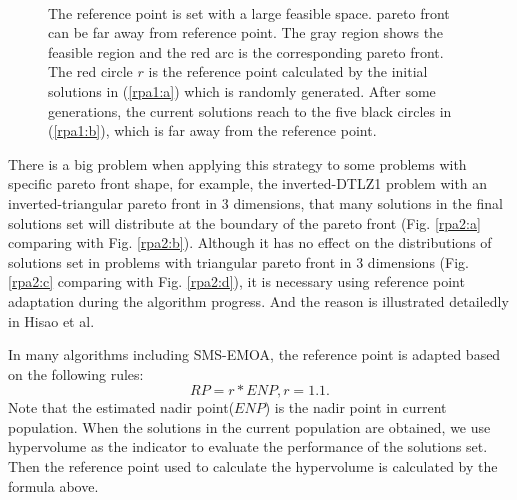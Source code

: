 \documentclass[conference]{IEEEtran}
\begin{document}
\begin{figure}[!t]
  \centering
  \quad
  \\
  \caption{The reference point is set with a large feasible space.
  pareto front can be far away from reference point.
  The gray region shows the feasible region and the red arc is the corresponding pareto front.
  The red circle $r$ is the reference point calculated by the initial solutions in (\ref{rpa1:a})
  which is randomly generated.
  After some generations, the current solutions reach to the five black circles in (\ref{rpa1:b}), 
  which is far away from the reference point.}
  \label{rpa1}
\end{figure}

There is a big problem when applying this strategy to some problems with specific pareto front shape, 
for example, the inverted-DTLZ1 problem with an inverted-triangular pareto front in 3 dimensions,
that many solutions in the final solutions set will distribute at the boundary of the pareto front
(Fig. \ref{rpa2:a} comparing with Fig. \ref{rpa2:b})\cite{hisao:RPexplanation, hisao:RPspecify, hisao:dynamic}. 
Although it has no effect on the distributions of solutions set 
in problems with triangular pareto front in 3 dimensions 
(Fig. \ref{rpa2:c} comparing with Fig. \ref{rpa2:d}), 
it is necessary using reference point adaptation during the algorithm progress.
And the reason is illustrated detailedly in Hisao et al\cite{hisao:RPexplanation}.

In many algorithms including SMS-EMOA\cite{smsemoa}, 
the reference point is adapted based on the following rules:
\begin{equation}\label{frpa1}
  RP = r * ENP, r = 1.1.
\end{equation}
Note that the estimated nadir point($ENP$) is the nadir point in current population.
When the solutions in the current population are obtained, 
we use hypervolume as the indicator to evaluate the performance of the solutions set. 
Then the reference point used to calculate the hypervolume is calculated by the formula above.
\end{document}
